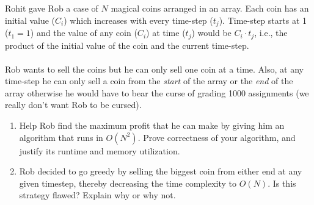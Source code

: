 \documentclass{common/cs157}
\begin{document}
\begin{problem}{3}
Rohit gave Rob a case of $N$ magical coins arranged in an array. Each coin has an initial value ($C_i$) which increases with every time-step ($t_j$). Time-step starts at 1 ($t_1 = 1$) and the value of any coin ($C_i$) at time ($t_j$) would be $C_i \cdot t_j$, i.e., the product of the initial value of the coin and the current time-step. 
\\\\
Rob wants to sell the coins but he can only sell one coin at a time. Also, at any time-step he can only sell a coin from the \textit{start} of the array or the \textit{end} of the array otherwise he would have to bear the curse of grading 1000 assignments (we really don't want Rob to be cursed).
\begin{enumerate}
    \item Help Rob find the maximum profit that he can make by giving him an algorithm that runs in $O(N^2)$. Prove correctness of your algorithm, and justify its runtime and memory utilization.
    \item Rob decided to go greedy by selling the biggest coin from either end at any given timestep, thereby decreasing the time complexity to $O(N)$. Is this strategy flawed? Explain why or why not.
\end{enumerate}
\end{problem}
\end{document}
